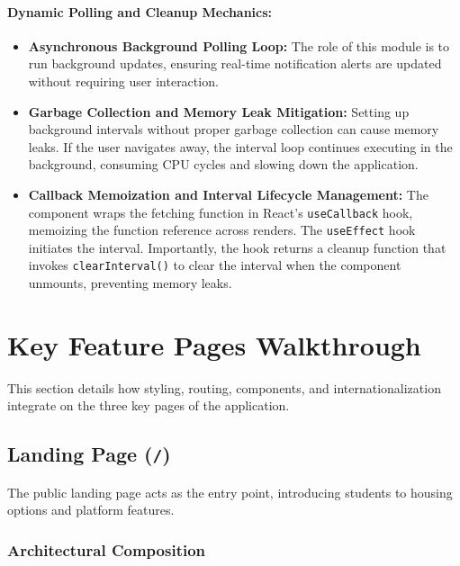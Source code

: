 \documentclass[12pt,a4paper]{article}
\begin{document}
\paragraph{Dynamic Polling and Cleanup Mechanics:}
\begin{itemize}[leftmargin=2em]
    \item \textbf{Asynchronous Background Polling Loop:} The role of this module is to run background updates, ensuring real-time notification alerts are updated without requiring user interaction.
    \item \textbf{Garbage Collection and Memory Leak Mitigation:} Setting up background intervals without proper garbage collection can cause memory leaks. If the user navigates away, the interval loop continues executing in the background, consuming CPU cycles and slowing down the application.
    \item \textbf{Callback Memoization and Interval Lifecycle Management:} The component wraps the fetching function in React's \texttt{useCallback} hook, memoizing the function reference across renders. The \texttt{useEffect} hook initiates the interval. Importantly, the hook returns a cleanup function that invokes \texttt{clearInterval()} to clear the interval when the component unmounts, preventing memory leaks.
\end{itemize}

\section{Key Feature Pages Walkthrough}

This section details how styling, routing, components, and internationalization integrate on the three key pages of the application.

\subsection{Landing Page (\texttt{/})}

The public landing page acts as the entry point, introducing students to housing options and platform features.

\subsubsection{Architectural Composition}
\end{document}

